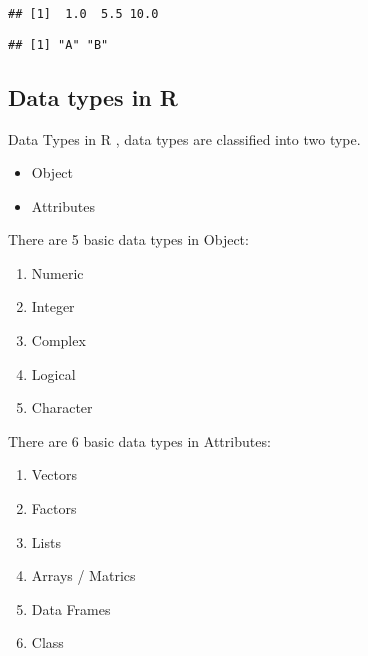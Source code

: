 \documentclass[
]{article}
\newenvironment{Shaded}{\begin{snugshade}}{\end{snugshade}}
\newcommand{\AttributeTok}[1]{\textcolor[rgb]{0.13,0.29,0.53}{#1}}
\newcommand{\CommentTok}[1]{\textcolor[rgb]{0.56,0.35,0.01}{\textit{#1}}}
\newcommand{\DecValTok}[1]{\textcolor[rgb]{0.00,0.00,0.81}{#1}}
\newcommand{\FunctionTok}[1]{\textcolor[rgb]{0.13,0.29,0.53}{\textbf{#1}}}
\newcommand{\NormalTok}[1]{#1}
\newcommand{\OtherTok}[1]{\textcolor[rgb]{0.56,0.35,0.01}{#1}}
\newcommand{\SpecialCharTok}[1]{\textcolor[rgb]{0.81,0.36,0.00}{\textbf{#1}}}
\newcommand{\StringTok}[1]{\textcolor[rgb]{0.31,0.60,0.02}{#1}}
\begin{document}
\begin{verbatim}
## [1]  1.0  5.5 10.0
\end{verbatim}

\begin{Shaded}
\end{Shaded}

\begin{verbatim}
## [1] "A" "B"
\end{verbatim}

\subsection{Data types in R}\label{data-types-in-r}

Data Types in R , data types are classified into two type.

\begin{itemize}
\item
  Object
\item
  Attributes
\end{itemize}

There are 5 basic data types in Object:

\begin{enumerate}
\def\labelenumi{\arabic{enumi}.}
\item
  Numeric
\item
  Integer
\item
  Complex
\item
  Logical
\item
  Character
\end{enumerate}

There are 6 basic data types in Attributes:

\begin{enumerate}
\def\labelenumi{\arabic{enumi}.}
\item
  Vectors
\item
  Factors
\item
  Lists
\item
  Arrays / Matrics
\item
  Data Frames
\item
  Class
\end{enumerate}
\end{document}

